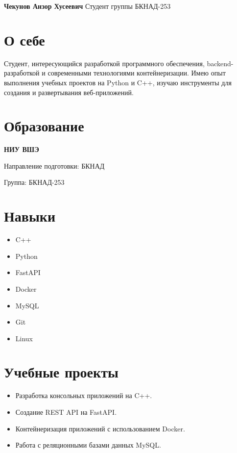 \documentclass[11pt,a4paper]{article}
\begin{document}
\begin{center}
{\LARGE \textbf{Чекунов Анзор Хусеевич}}
Студент группы БКНАД-253
\end{center}

\vspace{0.5cm}

\section*{О себе}

Студент, интересующийся разработкой программного обеспечения,
backend-разработкой и современными технологиями контейнеризации.
Имею опыт выполнения учебных проектов на Python и C++,
изучаю инструменты для создания и развертывания веб-приложений.

\section*{Образование}

\textbf{НИУ ВШЭ}

Направление подготовки: БКНАД

Группа: БКНАД-253

\section*{Навыки}

\begin{itemize}[leftmargin=*]
\item C++
\item Python
\item FastAPI
\item Docker
\item MySQL
\item Git
\item Linux
\end{itemize}

\section*{Учебные проекты}

\begin{itemize}[leftmargin=*]
\item Разработка консольных приложений на C++.
\item Создание REST API на FastAPI.
\item Контейнеризация приложений с использованием Docker.
\item Работа с реляционными базами данных MySQL.
\end{itemize}
\end{document}
